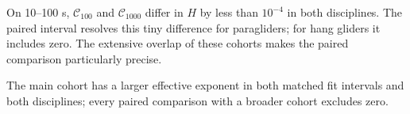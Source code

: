 On 10--100 s, $\mathcal C_{100}$ and $\mathcal C_{1000}$ differ in $H$ by less than $10^{-4}$ in both disciplines. The paired interval resolves this tiny difference for paragliders; for hang gliders it includes zero. The extensive overlap of these cohorts makes the paired comparison particularly precise.

The main cohort has a larger effective exponent in both matched fit intervals and both disciplines; every paired comparison with a broader cohort excludes zero.
